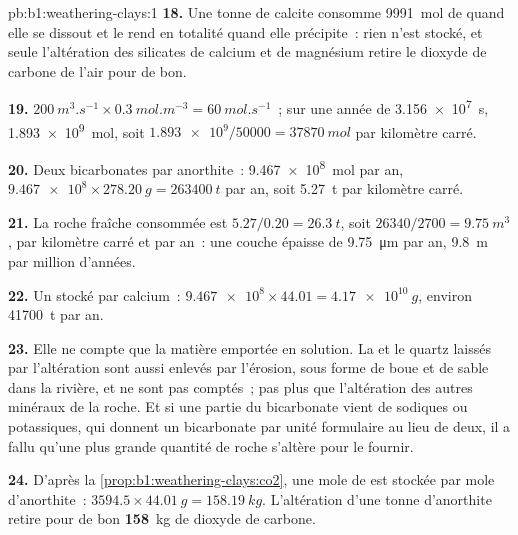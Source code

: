 \begin{solution}{pb:b1:weathering-clays:1}
\textbf{18.} Une tonne de calcite consomme \qty{9991}{mol} de  quand elle
se dissout et le rend en totalité quand elle précipite~: rien n'est stocké, et
seule l'altération des silicates de calcium et de magnésium retire le dioxyde de carbone
de l'air pour de bon.

\textbf{19.} $\qty{200}{m^3.s^{-1}} \times \qty{0.3}{mol.m^{-3}} =
\qty{60}{mol.s^{-1}}$~; sur une année de \qty{3.156e7}{s}, \qty{1.893e9}{mol}, soit
$\num{1.893e9}/\num{50000} = \qty{37870}{mol}$ par kilomètre carré.

\textbf{20.} Deux bicarbonates par anorthite~: \qty{9.467e8}{mol} par an,
$\num{9.467e8}\times\qty{278.20}{g} = \qty{263400}{t}$ par an, soit
\qty{5.27}{t} par kilomètre carré.

\textbf{21.} La roche fraîche consommée est $5.27/0.20 = \qty{26.3}{t}$, soit
$\num{26340}/2700 = \qty{9.75}{m^3}$, par kilomètre carré et par an~: une couche
épaisse de \qty{9.75}{\micro m} par an, \qty{9.8}{m} par million d'années.

\textbf{22.} Un  stocké par calcium~: $\num{9.467e8} \times 44.01 =
\qty{4.17e10}{g}$, environ \qty{41700}{t} par an.

\textbf{23.} Elle ne compte que la matière emportée en solution. La 
et le quartz laissés par l'altération sont aussi enlevés par l'érosion, sous forme de boue et de sable dans
la rivière, et ne sont pas comptés~; pas plus que l'altération des autres
minéraux de la roche. Et si une partie du bicarbonate vient de  sodiques ou
potassiques, qui donnent un bicarbonate par unité formulaire au lieu de
deux, il a fallu qu'une plus grande quantité de roche s'altère pour le fournir.

\textbf{24.} D'après la \cref{prop:b1:weathering-clays:co2}, une mole de  est
stockée par mole d'anorthite~: $3594.5 \times \qty{44.01}{g} = \qty{158.19}{kg}$.
L'altération d'une tonne d'anorthite retire pour de bon
\textbf{158}~kg de dioxyde de carbone.
\end{solution}
